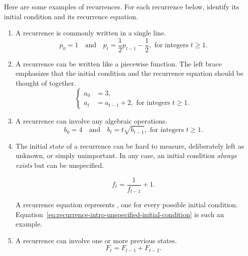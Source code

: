 \documentclass[../main.tex]{subfiles}
\begin{document}
\begin{example}
  Here are some examples of recurrences. For each recurrence below, identify its initial condition and its recurrence equation.

  \begin{enumerate}[wide, itemsep={2ex}]
    \item 
      A recurrence is commonly written in a single line.
      \begin{equation} \label{eq:recurrence-intro-oneline}
        p_{0} = 1 \quad\text{and}\quad p_{t} = \frac{1}{2} p_{t-1} - \frac{1}{2}, \text{ for integers } t \ge 1.
      \end{equation}

    \item 
      A recurrence can be written like a piecewise function. The left brace emphasizes that the initial condition and the recurrence equation should be thought of together. 
      \begin{equation} \label{eq:recurrence-intro-left-brace}
        \left\{
          \begin{aligned}
            a_{0} &= 3,  \\
            a_{t} &= a_{t-1} + 2,  \text{ for integers } t \ge 1.
          \end{aligned}
        \right.
      \end{equation}

    \item 
      A recurrence can involve any algebraic operations.
      \begin{equation} \label{eq:recurrence-intro-sqrt}
        b_{0} = 4 \quad\text{and}\quad b_{t} = t \sqrt{b_{t-1}}, \text{ for integers } t \ge 1.
      \end{equation}

    \item 
      The initial state of a recurrence can be hard to measure, deliberately left as unknown, or simply unimportant. In any case, an initial condition \emph{always exists} but can be unspecified.  

      \begin{equation} \label{eq:recurrence-intro-unspecified-initial-condition}
        f_{t} = \frac{1}{f_{t-1}} + 1.
      \end{equation}

      A recurrence equation  represents \underline{\hfill{} \phantom{Xy infinitely many recurrences Xy Xy}}, one for every possible initial condition. Equation~\eqref{eq:recurrence-intro-unspecified-initial-condition} is such an example.

    \item 
      A recurrence can involve one or more previous states.
      \begin{equation} \label{eq:recurrence-intro-fib}
        F_{t} = F_{t-1} + F_{t-2}.
      \end{equation}
  \end{enumerate}
\end{example}
\end{document}
